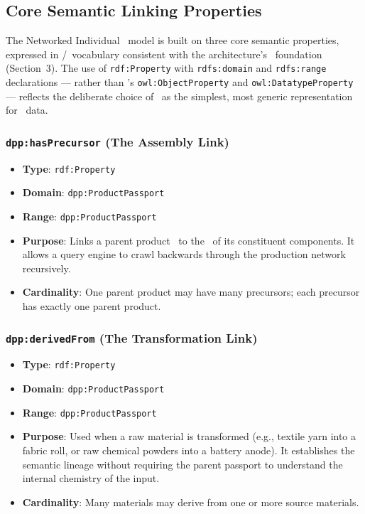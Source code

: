 \subsection{Core Semantic Linking Properties}

The Networked Individual \DPP\ model is built on three core semantic properties,
expressed in \RDF/\RDFS\ vocabulary consistent with the architecture's \RDF\
foundation (Section~3). The use of \texttt{rdf:Property} with
\texttt{rdfs:domain} and \texttt{rdfs:range} declarations --- rather than \OWL's
\texttt{owl:ObjectProperty} and \texttt{owl:DatatypeProperty} --- reflects the
deliberate choice of \RDF\ as the simplest, most generic representation for
\DPP\ data.

\subsubsection{\texttt{dpp:hasPrecursor} (The Assembly Link)}

\begin{itemize}
\item \textbf{Type}: \texttt{rdf:Property}
\item \textbf{Domain}: \texttt{dpp:ProductPassport}
\item \textbf{Range}: \texttt{dpp:ProductPassport}
\item \textbf{Purpose}: Links a parent product \DPP\ to the \DPPs\ of its
constituent components. It allows a query engine to crawl backwards through the
production network recursively.
\item \textbf{Cardinality}: One parent product may have many precursors; each
precursor has exactly one parent product.
\end{itemize}

\subsubsection{\texttt{dpp:derivedFrom} (The Transformation Link)}

\begin{itemize}
\item \textbf{Type}: \texttt{rdf:Property}
\item \textbf{Domain}: \texttt{dpp:ProductPassport}
\item \textbf{Range}: \texttt{dpp:ProductPassport}
\item \textbf{Purpose}: Used when a raw material is transformed (e.g., textile
yarn into a fabric roll, or raw chemical powders into a battery anode). It
establishes the semantic lineage without requiring the parent passport to
understand the internal chemistry of the input.
\item \textbf{Cardinality}: Many materials may derive from one or more source
materials.
\end{itemize}

